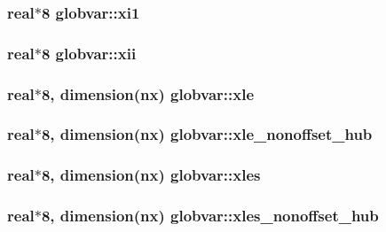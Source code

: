 \subsubsection[{xi1}]{\setlength{\rightskip}{0pt plus 5cm}real$\ast$8 globvar\+::xi1}\label{namespaceglobvar_a1ccb279a7cd37dd73fbd7b0e07033e12}
\hypertarget{namespaceglobvar_a8d862a934e23da5ae319710a879706ba}{}
\subsubsection[{xii}]{\setlength{\rightskip}{0pt plus 5cm}real$\ast$8 globvar\+::xii}\label{namespaceglobvar_a8d862a934e23da5ae319710a879706ba}
\hypertarget{namespaceglobvar_acf2d15a74c6397bfde89f463fd847958}{}
\subsubsection[{xle}]{\setlength{\rightskip}{0pt plus 5cm}real$\ast$8, dimension({\bf nx}) globvar\+::xle}\label{namespaceglobvar_acf2d15a74c6397bfde89f463fd847958}
\hypertarget{namespaceglobvar_a2b6fa2e27e00de6d45f740070d260fd0}{}
\subsubsection[{xle\+\_\+nonoffset\+\_\+hub}]{\setlength{\rightskip}{0pt plus 5cm}real$\ast$8, dimension({\bf nx}) globvar\+::xle\+\_\+nonoffset\+\_\+hub}\label{namespaceglobvar_a2b6fa2e27e00de6d45f740070d260fd0}
\hypertarget{namespaceglobvar_a836c8bf8d7637655fc19c4c13b925a62}{}
\subsubsection[{xles}]{\setlength{\rightskip}{0pt plus 5cm}real$\ast$8, dimension({\bf nx}) globvar\+::xles}\label{namespaceglobvar_a836c8bf8d7637655fc19c4c13b925a62}
\hypertarget{namespaceglobvar_a4774d9677c832856ce10a0773f0bafef}{}
\subsubsection[{xles\+\_\+nonoffset\+\_\+hub}]{\setlength{\rightskip}{0pt plus 5cm}real$\ast$8, dimension({\bf nx}) globvar\+::xles\+\_\+nonoffset\+\_\+hub}\label{namespaceglobvar_a4774d9677c832856ce10a0773f0bafef}
\hypertarget{namespaceglobvar_aa5ba5cdfdecc13b0a215ac7e8bee5b9f}{}
